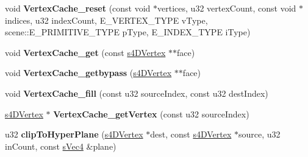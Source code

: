 \begin{DoxyCompactItemize}
\item 
\hypertarget{classirr_1_1video_1_1_c_burning_video_driver_a4961fae0313990870bdbc830ae810b92}{void {\bfseries Vertex\-Cache\-\_\-reset} (const void $\ast$vertices, u32 vertex\-Count, const void $\ast$indices, u32 index\-Count, E\-\_\-\-V\-E\-R\-T\-E\-X\-\_\-\-T\-Y\-P\-E v\-Type, scene\-::\-E\-\_\-\-P\-R\-I\-M\-I\-T\-I\-V\-E\-\_\-\-T\-Y\-P\-E p\-Type, E\-\_\-\-I\-N\-D\-E\-X\-\_\-\-T\-Y\-P\-E i\-Type)}\label{classirr_1_1video_1_1_c_burning_video_driver_a4961fae0313990870bdbc830ae810b92}

\item 
\hypertarget{classirr_1_1video_1_1_c_burning_video_driver_a26947f341ab77fface9556971e2cc7e0}{void {\bfseries Vertex\-Cache\-\_\-get} (const \hyperlink{structirr_1_1video_1_1s4_d_vertex}{s4\-D\-Vertex} $\ast$$\ast$face)}\label{classirr_1_1video_1_1_c_burning_video_driver_a26947f341ab77fface9556971e2cc7e0}

\item 
\hypertarget{classirr_1_1video_1_1_c_burning_video_driver_a79d98bedb6bc1bb5cc14a67b8d58f4f6}{void {\bfseries Vertex\-Cache\-\_\-getbypass} (\hyperlink{structirr_1_1video_1_1s4_d_vertex}{s4\-D\-Vertex} $\ast$$\ast$face)}\label{classirr_1_1video_1_1_c_burning_video_driver_a79d98bedb6bc1bb5cc14a67b8d58f4f6}

\item 
\hypertarget{classirr_1_1video_1_1_c_burning_video_driver_afdb5875dcf6195e0b3e2253a2e4e7d15}{void {\bfseries Vertex\-Cache\-\_\-fill} (const u32 source\-Index, const u32 dest\-Index)}\label{classirr_1_1video_1_1_c_burning_video_driver_afdb5875dcf6195e0b3e2253a2e4e7d15}

\item 
\hypertarget{classirr_1_1video_1_1_c_burning_video_driver_aab8b80b156041e3832e88323faa1d269}{\hyperlink{structirr_1_1video_1_1s4_d_vertex}{s4\-D\-Vertex} $\ast$ {\bfseries Vertex\-Cache\-\_\-get\-Vertex} (const u32 source\-Index)}\label{classirr_1_1video_1_1_c_burning_video_driver_aab8b80b156041e3832e88323faa1d269}

\item 
\hypertarget{classirr_1_1video_1_1_c_burning_video_driver_abb1c864e154a57908d27835d134a79c6}{u32 {\bfseries clip\-To\-Hyper\-Plane} (\hyperlink{structirr_1_1video_1_1s4_d_vertex}{s4\-D\-Vertex} $\ast$dest, const \hyperlink{structirr_1_1video_1_1s4_d_vertex}{s4\-D\-Vertex} $\ast$source, u32 in\-Count, const \hyperlink{structirr_1_1video_1_1s_vec4}{s\-Vec4} \&plane)}\label{classirr_1_1video_1_1_c_burning_video_driver_abb1c864e154a57908d27835d134a79c6}


\end{DoxyCompactItemize}
